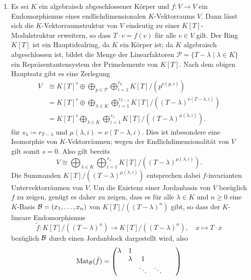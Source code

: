 \begin{solution}
\begin{enumerate}
    \item
      Es sei $K$ ein algebraisch abgeschlossener Körper und $f \colon V \to V$ ein Endomorphismus eines endlichdimensionalen $K$-Vektorraums $V$.
      Dann lässt sich die $K$-Vektorraumstruktur von $V$ eindeutig zu einer $K[T]$-Modulstruktur erweitern, so dass $T \cdot v = f(v)$ für alle $v \in V$ gilt.
      Der Ring $K[T]$ ist ein Hauptidealring, da $K$ ein Körper ist;
      da $K$ algebraisch abgeschlossen ist, bildet die Menge der Linearfaktoren $\mathcal{P} = \{T - \lambda \mid \lambda \in K\}$ ein Repräsentantensystem der Primelemente von $K[T]$.
      Nach dem obigen Hauptsatz gibt es eine Zerlegung
      \begin{align*}
        V
        &\cong K[T]^s \oplus \bigoplus_{p \in \mathcal{P}} \bigoplus_{i=1}^{r_p} K[T]/(p^{\nu(p,i)})
        \\
        &=     K[T]^s \oplus \bigoplus_{\lambda \in K} \bigoplus_{i=1}^{r_{T-\lambda}} K[T]/( (T - \lambda)^{\nu(T-\lambda,i)} )
        \\
        &=     K[T]^s \bigoplus_{\lambda \in K} \bigoplus_{i=1}^{s_\lambda} K[T]/( (T-\lambda)^{\mu(\lambda, i)} ).
      \end{align*}
      für $s_\lambda \coloneqq r_{T-\lambda}$ und $\mu(\lambda,i) = \nu(T-\lambda,i)$.
      Dies ist inbesondere eine Isomorphie von $K$-Vektorräumen;
      wegen der Endlichdimensionalität von $V$ gilt somit $s = 0$.
      Also gilt bereits
      \[
        V \cong \bigoplus_{\lambda \in K} \bigoplus_{i=1}^{s_\lambda} K[T]/( (T-\lambda)^{\mu(\lambda, i)} ).
      \]
      Die Summanden $K[T]/( (T-\lambda)^{\mu(\lambda, i)} )$ entsprechen dabei $f$-invarianten Untervektorräumen von $V$.
      Um die Existenz einer Jordanbasis von $V$ bezüglich $f$ zu zeigen, genügt es daher zu zeigen, dass es für alle $\lambda \in K$ und $n \geq 0$ eine $K$-Basis $\mathcal{B} = (x_1, \dotsc, x_n)$ von $K[T]/( (T-\lambda)^n )$ gibt, so dass der $K$-lineare Endomorphismus
      \[
        \tilde{f} \colon K[T]/((T-\lambda)^n) \to K[T]/((T-\lambda)^n),
        \quad
        x \mapsto T \cdot x
      \]
      bezüglich $\mathcal{B}$ durch einen Jordanblock dargestellt wird, also
      \[
        \operatorname{Mat}_{\mathcal{B}}(\tilde{f})
        =
        \begin{pmatrix}
          \lambda & 1       &         &         &         &         \\
                  & \lambda & 1       &         &         &         \\
                  &         & \ddots  & \ddots  &         &         \\

\end{pmatrix}\]
\end{enumerate}
\end{solution}
